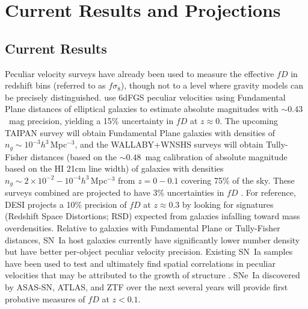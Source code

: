 \section{Current Results and Projections}
\subsection{Current Results}
Peculiar velocity surveys have already been  used to measure
the effective $fD$ in redshift bins  (referred to as $f\sigma_8$), though not to a level where  gravity models can be precisely distinguished.
 \citet{2017MNRAS.471..839A} use 6dFGS peculiar velocities using  Fundamental Plane distances of elliptical galaxies to estimate absolute magnitudes
 with
 $\sim 0.43$~mag  precision, yielding a 15\% uncertainty in $fD$ at $z\approx 0$.
The upcoming 
TAIPAN survey \citep{2017PASA...34...47D} will obtain Fundamental Plane galaxies with densities of $n_g \sim 10^{-3}h^3$\,Mpc$^{-3}$,
and the WALLABY+WNSHS surveys \citep{2008ExA....22..151J} will obtain Tully-Fisher distances (based on the $\sim 0.48$~mag calibration of absolute magnitude based on the  HI 21cm line width)
of galaxies with densities $n_g \sim 2\times 10^{-2} - 10^{-4} h^3$\,Mpc$^{-3}$ from
$z=0-0.1$ covering 75\% of the sky.
These surveys combined are projected to have 3\% uncertainties in $fD$ \citep{2017MNRAS.464.2517H}.
For reference, DESI projects a 10\% precision of $fD$ at $z \approx 0.3$  by looking 
for signatures (Redshift Space Distortions; RSD) expected from galaxies infalling toward mass overdensities.
Relative to galaxies with  Fundamental Plane or Tully-Fisher distances, 
SN~Ia host galaxies currently have significantly lower number density but have better per-object peculiar velocity precision.
Existing SN~Ia samples
have been used to test and ultimately find spatial correlations in peculiar velocities that may be attributed to the growth of structure
\citep{PhysRevLett.99.081301,2008MNRAS.389L..47A,2014MNRAS.444.3926J,2015JCAP...12..033H, 2017JCAP...05..015H}.
SNe~Ia discovered by ASAS-SN, ATLAS, and ZTF \citep{2014ApJ...788...48S,2018PASP..130f4505T,2019PASP..131a8002B} over the next several years will provide first probative measures of $fD$ at $z<0.1$.

